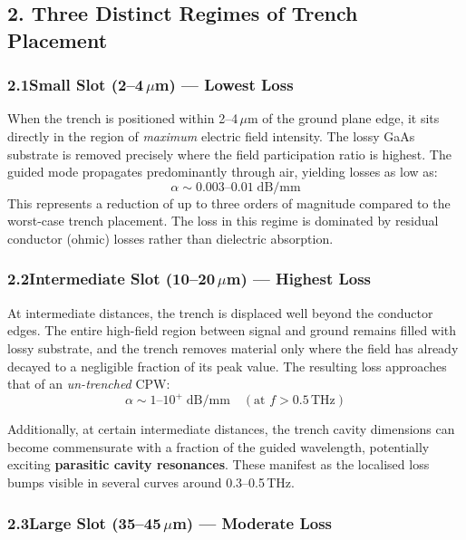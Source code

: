\subsection*{2. Three Distinct Regimes of Trench Placement}

\subsubsection*{2.1\quad Small Slot (2--4\,$\mu$m) --- Lowest Loss}

When the trench is positioned within 2--4\,$\mu$m of the ground plane edge, it sits directly in the region of \textit{maximum} electric field intensity. The lossy GaAs substrate is removed precisely where the field participation ratio is highest. The guided mode propagates predominantly through air, yielding losses as low as:
\begin{equation}
    \alpha \sim 0.003\text{--}0.01 \; \mathrm{dB/mm}
\end{equation}
This represents a reduction of up to three orders of magnitude compared to the worst-case trench placement. The loss in this regime is dominated by residual conductor (ohmic) losses rather than dielectric absorption.

\subsubsection*{2.2\quad Intermediate Slot (10--20\,$\mu$m) --- Highest Loss}

At intermediate distances, the trench is displaced well beyond the conductor edges. The entire high-field region between signal and ground remains filled with lossy substrate, and the trench removes material only where the field has already decayed to a negligible fraction of its peak value. The resulting loss approaches that of an \textit{un-trenched} CPW:
\begin{equation}
    \alpha \sim 1\text{--}10^{+} \; \mathrm{dB/mm} \quad (\text{at } f > 0.5\,\text{THz})
\end{equation}

Additionally, at certain intermediate distances, the trench cavity dimensions can become commensurate with a fraction of the guided wavelength, potentially exciting \textbf{parasitic cavity resonances}. These manifest as the localised loss bumps visible in several curves around 0.3--0.5\,THz.

\subsubsection*{2.3\quad Large Slot (35--45\,$\mu$m) --- Moderate Loss}


